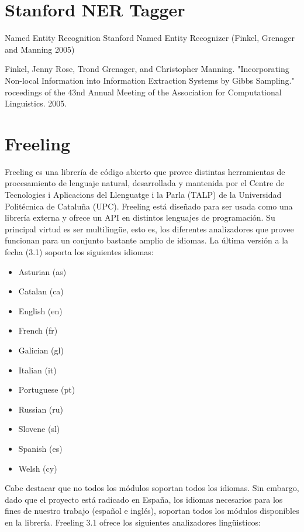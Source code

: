 \section{Stanford NER Tagger}
\label{sec:stanford-ner}

Named Entity Recognition Stanford Named Entity Recognizer (Finkel, 
Grenager and Manning 2005) 

Finkel, Jenny Rose, Trond Grenager, and Christopher Manning. "Incorporating 
Non-local Information into Information Extraction Systems by Gibbs Sampling." 
roceedings of the 43nd Annual Meeting of the Association for Computational 
Linguistics. 2005. \cite{NER2}


\section{Freeling}
\label{sec:freeling}
Freeling es una librería de c\'odigo abierto que provee distintas herramientas de 
procesamiento de lenguaje natural, desarrollada y mantenida por el Centre de Tecnologies 
i Aplicacions del Llenguatge i la Parla (TALP) de la Universidad Politécnica de Catalu\~na (UPC). 
Freeling está dise\~nado para ser usada como una librería externa y ofrece un API en distintos lenguajes
de programaci\'on. Su principal virtud es ser multilingüe, esto es, los diferentes analizadores que provee funcionan 
para un conjunto bastante amplio de idiomas. La última versi\'on a la fecha (3.1) soporta los siguientes idiomas:

\begin{itemize}
\item Asturian (as)
\item Catalan (ca) 
\item English (en)
\item French (fr) 
\item Galician (gl)
\item Italian (it)
\item Portuguese (pt)
\item Russian (ru)
\item Slovene (sl)
\item Spanish (es)
\item Welsh (cy)
\end{itemize}

Cabe destacar que no todos los m\'odulos soportan todos los idiomas. Sin embargo, dado que el proyecto está radicado en Espa\~na,
los idiomas necesarios para los fines de nuestro trabajo (espa\~nol e inglés), soportan todos los m\'odulos disponibles
en la librería.
Freeling 3.1 ofrece los siguientes analizadores lingüisticos:

